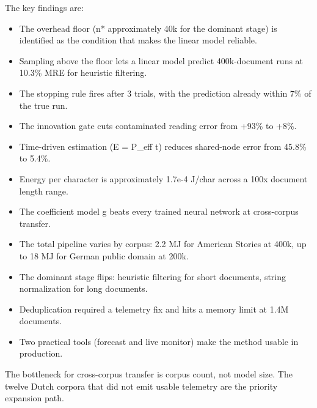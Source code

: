 \documentclass[12pt,a4paper]{article}
\begin{document}
The key findings are:

\begin{itemize}
  \item The overhead floor (n* approximately 40k for the dominant stage) is identified as the condition that makes the linear model reliable.
  \item Sampling above the floor lets a linear model predict 400k-document runs at 10.3\% MRE for heuristic filtering.
  \item The stopping rule fires after 3 trials, with the prediction already within 7\% of the true run.
  \item The innovation gate cuts contaminated reading error from +93\% to +8\%.
  \item Time-driven estimation (E = P\_eff t) reduces shared-node error from 45.8\% to 5.4\%.
  \item Energy per character is approximately 1.7e-4 J/char across a 100x document length range.
  \item The coefficient model g beats every trained neural network at cross-corpus transfer.
  \item The total pipeline varies by corpus: 2.2 MJ for American Stories at 400k, up to 18 MJ for German public domain at 200k.
  \item The dominant stage flips: heuristic filtering for short documents, string normalization for long documents.
  \item Deduplication required a telemetry fix and hits a memory limit at 1.4M documents.
  \item Two practical tools (forecast and live monitor) make the method usable in production.
\end{itemize}

The bottleneck for cross-corpus transfer is corpus count, not model size. The twelve Dutch corpora that did not emit usable telemetry are the priority expansion path.


\end{document}
